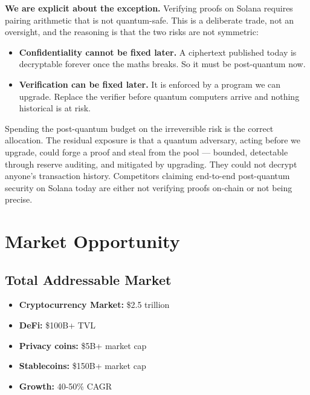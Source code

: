 \documentclass[11pt,a4paper]{article}
\begin{document}
\textbf{We are explicit about the exception.} Verifying proofs on Solana requires pairing arithmetic that is not quantum-safe. This is a deliberate trade, not an oversight, and the reasoning is that the two risks are not symmetric:

\begin{itemize}[leftmargin=*]
    \item \textbf{Confidentiality cannot be fixed later.} A ciphertext published today is decryptable forever once the maths breaks. So it must be post-quantum now.
    \item \textbf{Verification can be fixed later.} It is enforced by a program we can upgrade. Replace the verifier before quantum computers arrive and nothing historical is at risk.
\end{itemize}

Spending the post-quantum budget on the irreversible risk is the correct allocation. The residual exposure is that a quantum adversary, acting before we upgrade, could forge a proof and steal from the pool --- bounded, detectable through reserve auditing, and mitigated by upgrading. They could not decrypt anyone's transaction history. Competitors claiming end-to-end post-quantum security on Solana today are either not verifying proofs on-chain or not being precise.

\section{Market Opportunity}

\subsection{Total Addressable Market}

\begin{itemize}[leftmargin=*]
    \item \textbf{Cryptocurrency Market:} \$2.5 trillion
    \item \textbf{DeFi:} \$100B+ TVL
    \item \textbf{Privacy coins:} \$5B+ market cap
    \item \textbf{Stablecoins:} \$150B+ market cap
    \item \textbf{Growth:} 40-50\% CAGR
\end{itemize}
\end{document}
